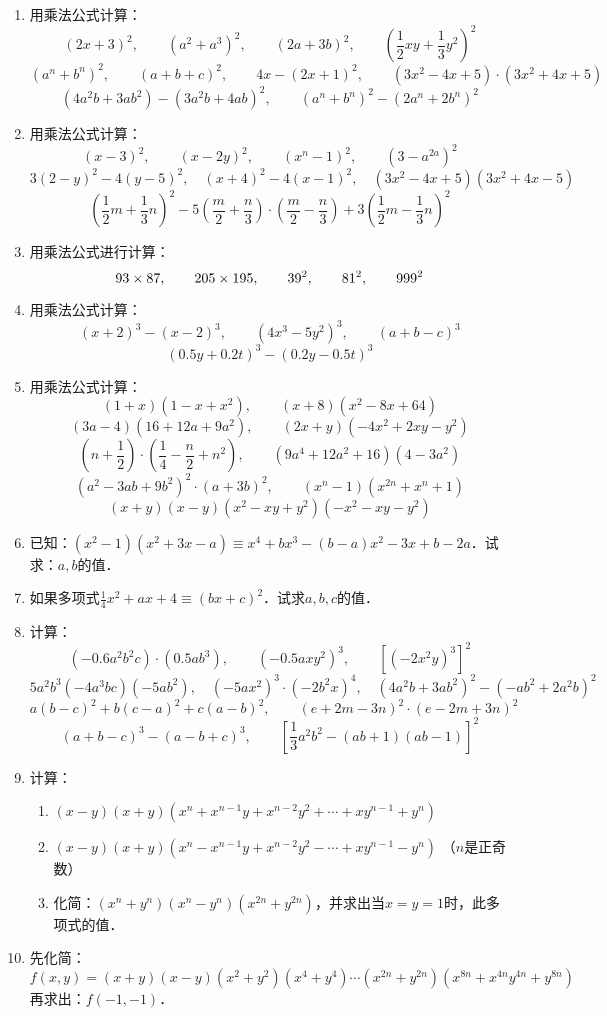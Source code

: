 \begin{enumerate}
\item 用乘法公式计算：
\[(2x+3)^2,\qquad  (a^2+a^3)^2,\qquad  (2a+3b)^2,\qquad  \left(\frac{1}{2}xy+\frac{1}{3}y^2\right)^2\]
\[(a^n+b^n)^2,\qquad  (a+b+c)^2,\qquad  4x- (2x+1)^2,\qquad  (3x^2-4x+5) \cdot  (3x^2+4x+5) \]
\[(4a^2b+3ab^2) - (3a^2b+4ab)^ 2,\qquad (a^n+b^n)^2-(2a^n+2b^n)^2\]

\item 用乘法公式计算：
\[(x-3)^2,\qquad (x-2y)^2,\qquad (x^n-1)^2,\qquad \left(3-a^{2a}\right)^2 \]
\[3(2-y)^2-4(y-5)^2,\quad (x+4)^2-4(x-1)^2,\quad (3x^2-4x+5)(3x^2+4x-5) \]
\[\left(\frac{1}{2}m+\frac{1}{3}n\right)^2 -5\left(\frac{m}{2}+\frac{n}{3}\right)\cdot \left(\frac{m}{2}-\frac{n}{3}\right)+3\left(\frac{1}{2}m-\frac{1}{3}n\right)^2  \]

\item 用乘法公式进行计算：
\[93\times 87,\qquad 205\times 195,\qquad 39^2,\qquad 81^2,\qquad 999^2 \]

\item 用乘法公式计算：
\[(x+2)^3-(x-2)^3,\qquad (4x^3-5y^2)^3,\qquad (a+b-c)^3  \]
\[ (0.5y+0.2t)^3-(0.2y-0.5t)^3 \]

\item 用乘法公式计算：
\[(1+x)(1-x+x^2),\qquad (x+8)(x^2-8x+64) \]
\[(3a-4)(16+12a+9a^2),\qquad (2x+y)(-4x^2+2xy-y^2)\]
\[\left(n+\frac{1}{2}\right)\cdot \left(\frac{1}{4}-\frac{n}{2}+n^2\right),\qquad (9a^4+12a^2+16)(4-3a^2)\]
\[(a^2-3ab+9b^2)^2\cdot (a+3b)^2,\qquad (x^n-1)(x^{2n}+x^n+1)\]
\[(x+y)(x-y)(x^2-xy+y^2)(-x^2-xy-y^2)\]

\item 已知：$(x^2-1)(x^2+3x-a)\equiv x^4+bx^3-(b-a)x^2-3x+b-2a$．试求：$a,b$的值．
\item  如果多项式$\frac{1}{4}x^2+ax+4\equiv (bx+c)^2$．试求$a,b,c$的值．
\item 计算：
\[(-0.6a^2b^2c)\cdot (0.5ab^3),\qquad (-0.5axy^2)^3,\qquad [(-2x^2y)^3]^2\]
\[5a^2b^3 (-4a^3bc)(-5ab^2),\quad (-5ax^2)^3\cdot (-2b^2x)^4,\quad (4a^2b+3ab^2)^2-(-ab^2+2a^2b)^2\]
\[a(b-c)^2+b(c-a)^2+c(a-b)^2,\qquad (e+2m-3n)^2\cdot (e-2m+3n)^2\]
\[(a+b-c)^3-(a-b+c)^3,\qquad \left[\frac{1}{3}a^2b^2-(ab+1)(ab-1)\right]^2\]
\item 计算：
\begin{enumerate}
    \item $(x-y)(x+y)(x^n+x^{n-1}y+x^{n-2}y^2+\cdots +xy^{n-1}+y^n)$
    \item $(x-y)(x+y)(x^n-x^{n-1}y+x^{n-2}y^2-\cdots +xy^{n-1}-y^n)$ （$n$是正奇数）
    \item 化简：$(x^n+y^n)(x^n-y^n)(x^{2n}+y^{2n})$，并求出当$x=y=1$时，此多项式的值．
\end{enumerate}

\item 先化简：
\[f(x,y)=(x+y)(x-y)(x^2+y^2)(x^4+y^4)\cdots (x^{2n}+y^{2n})\left(x^{8n}+x^{4n}y^{4n}+y^{8n}\right)  \]
再求出：$f(-1,-1)$．
\end{enumerate}

